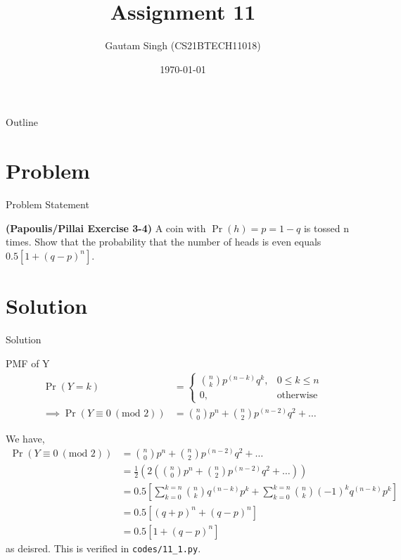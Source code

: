 \documentclass{beamer}
\title{Assignment 11}
\author{Gautam Singh (CS21BTECH11018)}
\date{\today}
\providecommand{\pr}[1]{\ensuremath{\Pr\left(#1\right)}}
\begin{document}
\begin{frame}
    \titlepage 
\end{frame}

\begin{frame}{Outline}
    \tableofcontents
\end{frame}


\section{Problem}
\begin{frame}{Problem Statement}

\textbf{(Papoulis/Pillai Exercise 3-4)} A coin with $\pr{h} = p = 1 - q$ is tossed n times. Show that the probability that the number
of heads is even equals $0.5[1 + (q - p)^n]$. 

\end{frame}


\section{Solution}

\begin{frame}{Solution}
    \begin{alertblock}{PMF of Y}
        \begin{align}
            \pr{Y = k} &= 
            \begin{cases}
                \binom{n}{k}p^{(n - k)}q^k, & 0 \leq k \leq n \\
                0, & \textrm{otherwise} 
            \end{cases}  \\
            \implies \pr{Y \equiv 0\ (\textrm{mod } 2)} &= \binom{n}{0}p^n + \binom{n}{2}p^{(n - 2)}q^2 + \ldots
        \end{align}
    \end{alertblock}
\end{frame}

\begin{frame}
    We have, 
    \begin{align}
        \pr{Y \equiv 0\ (\textrm{mod } 2)} &= \binom{n}{0}p^n + \binom{n}{2}p^{(n - 2)}q^2 + \ldots \\ 
		&= \frac{1}{2}(2(\binom{n}{0}p^n + \binom{n}{2}p^{(n - 2)}q^2 + \ldots)) \\
		&= 0.5[\sum_{k = 0}^{k = n}\binom{n}{k}q^{(n - k)}p^k + \sum_{k = 0}^{k = n}\binom{n}{k}(-1)^kq^{(n - k)}p^k] \\
		&= 0.5[(q + p)^n + (q - p)^n] \\
		&= 0.5[1 + (q - p)^n]
        \label{eq:proof}
    \end{align}
    as deisred. This is verified in \texttt{codes/11\_1.py}.
\end{frame}
\end{document}
